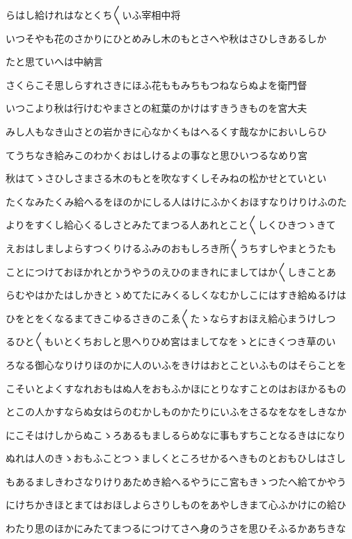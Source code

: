 \documentclass[a4paper,11pt,landscape]{ltjtarticle}
\begin{document}
らはし給けれはなとくち〱いふ宰相中将
\par\medskip
いつそやも花のさかりにひとめみし木のもとさへや秋はさひしきあるしか
\par\medskip
たと思ていへは中納言
\par\medskip
さくらこそ思しらすれさきにほふ花ももみちもつねならぬよを衛門督
\par\medskip
いつこより秋は行けむやまさとの紅葉のかけはすきうきものを宮大夫
\par\medskip
みし人もなき山さとの岩かきに心なかくもはへるくす哉なかにおいしらひ
\par\medskip
てうちなき給みこのわかくおはしけるよの事なと思ひいつるなめり宮
\par\medskip
秋はてゝさひしさまさる木のもとを吹なすくしそみねの松かせとていとい
\par\medskip
たくなみたくみ給へるをほのかにしる人はけにふかくおほすなりけりけふのた
\par\medskip
よりをすくし給心くるしさとみたてまつる人あれとこと〱しくひきつゝきて
\par\medskip
えおはしましよらすつくりけるふみのおもしろき所〱うちすしやまとうたも
\par\medskip
ことにつけておほかれとかうやうのえひのまきれにましてはか〱しきことあ
\par\medskip
らむやはかたはしかきとゝめてたにみくるしくなむかしこにはすき給ぬるけは
\par\medskip
ひをとをくなるまてきこゆるさきのこゑ〱たゝならすおほえ給心まうけしつ
\par\medskip
るひと〱もいとくちおしと思へりひめ宮はましてなをゝとにきくつき草のい
\par\medskip
ろなる御心なりけりほのかに人のいふをきけはおとこといふものはそらことを
\par\medskip
こそいとよくすなれおもはぬ人をおもふかほにとりなすことのはおほかるもの
\par\medskip
とこの人かすならぬ女はらのむかしものかたりにいふをさるなをなをしきなか
\par\medskip
にこそはけしからぬこゝろあるもましるらめなに事もすちことなるきはになり
\par\medskip
ぬれは人のきゝおもふことつゝましくところせかるへきものとおもひしはさし
\par\medskip
もあるましきわさなりけりあためき給へるやうにこ宮もきゝつたへ給てかやう
\par\medskip
にけちかきほとまてはおほしよらさりしものをあやしきまて心ふかけにの給ひ
\par\medskip
わたり思のほかにみたてまつるにつけてさへ身のうさを思ひそふるかあちきな
\end{document}
